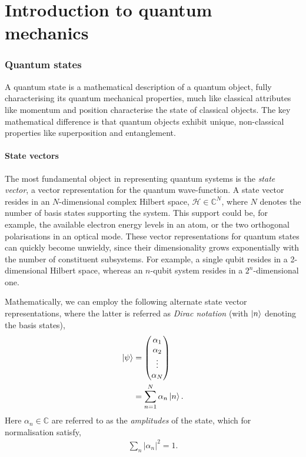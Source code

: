 \documentclass[aps,pra,twocolumn,amsmath,amssymb,nofootinbib,superscriptaddress]{revtex4}
\newcommand{\dropcap}[2]{\lettrine[lines=2, findent=3pt, nindent=0pt]{#1}{#2}}
\begin{document}
%
%

\part{Introduction to quantum mechanics}

%
%

\section{Quantum states}

\dropcap{A}{} quantum state is a mathematical description of a quantum object, fully characterising its quantum mechanical properties, much like classical attributes like momentum and position characterise the state of classical objects. The key mathematical difference is that quantum objects exhibit unique, non-classical properties like superposition and entanglement.

%
%

\subsection{State vectors}

The most fundamental object in representing quantum systems is the \textit{state vector}, a vector representation for the quantum wave-function. A state vector resides in an $N$-dimensional complex Hilbert space, \mbox{$\mathcal{H}\in\mathbb{C}^N$}, where $N$ denotes the number of basis states supporting the system. This support could be, for example, the available electron energy levels in an atom, or the two orthogonal polarisations in an optical mode. These vector representations for quantum states can quickly become unwieldy, since their dimensionality grows exponentially with the number of constituent subsystems. For example, a single qubit resides in a 2-dimensional Hilbert space, whereas an $n$-qubit system resides in a $2^n$-dimensional one.

Mathematically, we can employ the following alternate state vector representations, where the latter is referred as \textit{Dirac notation} (with $\ket{n}$ denoting the basis states),
\begin{align}
	\ket\psi &= \left(\begin{matrix}{}
	\alpha_1\\
	\alpha_2\\
	\vdots\\
	\alpha_N
\end{matrix}\right)\nonumber\\
	&= \sum_{n=1}^N \alpha_n \ket{n}.
\end{align}
Here \mbox{$\alpha_n\in\mathbb{C}$} are referred to as the \textit{amplitudes} of the state, which for normalisation satisfy,
\begin{align}\label{eq:state_norm_cond}
\sum_n |\alpha_n|^2 = 1.
\end{align}
\end{document}
